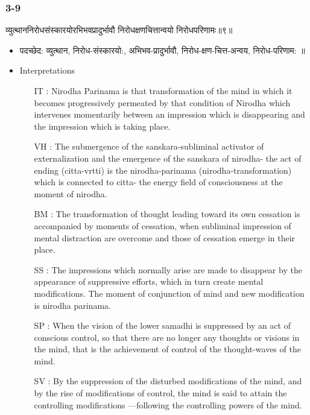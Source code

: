 \begin{frame}[fragile]\frametitle{3-9}
\begin{sanskrit}
व्युत्थाननिरोधसंस्कारयोरभिभवप्रादुर्भावौ निरोधक्षणचित्तान्वयो निरोधपरिणामः॥९॥
\end{sanskrit}

	\begin{itemize}
	\item पदच्छेद: व्युत्थान, निरोध-संस्कारयो:, अभिभव-प्रादुर्भावौ, निरोध-क्षण-चित्त-अन्वय, निरोध-परिणाम: ॥
	\item Interpretations
		\begin{itemize}	
		\item [IT]: Nirodha Parinama is that transformation of the mind in which it becomes progressively permeated by that condition of Nirodha which intervenes momentarily between an impression which is disappearing and the impression which is taking place.
		\item [VH]: The submergence of the sanskara-subliminal activator of externalization and the emergence of the sanskara of nirodha- the act of ending (citta-vrtti) is the nirodha-parinama (nirodha-transformation) which is connected to citta- the energy field of consciousness at the moment of nirodha.
		\item [BM]: The transformation of thought leading toward its own cessation is accompanied by moments of cessation, when subliminal impression of mental distraction are overcome and those of cessation emerge in their place.
		\item [SS]: The impressions which normally arise are made to disappear by the appearance of suppressive efforts, which in turn create mental modifications. The moment of conjunction of mind and new modification is nirodha parinama.
		\item [SP]: When the vision of the lower samadhi is suppressed by an act of conscious control, so that there are no longer any thoughts or visions in the mind, that is the achievement of control of the thought-waves of the mind.
		\item [SV]: By the suppression of the disturbed modifications of the mind, and by the rise of modifications of control, the mind is said to attain the controlling modifications —following the controlling powers of the mind. 
		\end{itemize}
	\end{itemize}
\end{frame}

